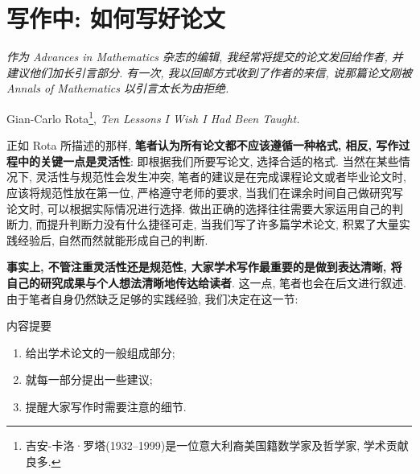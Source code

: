 \documentclass{booki}
\begin{document}
\section{写作中: 如何写好论文}
\noindent \textit{作为 Advances in Mathematics 杂志的编辑, 我经常将提交的论文发回给作者, 并建议他们加长引言部分. 有一次, 我以回邮方式收到了作者的来信, 说那篇论文刚被 Annals of Mathematics 以引言太长为由拒绝. }
\begin{flushright}
    \cndash Gian-Carlo Rota\footnote{吉安-卡洛·罗塔(1932–1999)是一位意大利裔美国籍数学家及哲学家, 学术贡献良多.}, \textit{Ten Lessons I Wish I Had Been Taught\cite{RotaTen1997}.}
\end{flushright}

正如 Rota 所描述的那样, \textbf{笔者认为所有论文都不应该遵循一种格式, 相反, 写作过程中的关键一点是灵活性}: 即根据我们所要写论文, 选择合适的格式.
当然在某些情况下, 灵活性与规范性会发生冲突, 笔者的建议是在完成课程论文或者毕业论文时, 应该将规范性放在第一位{,} 严格遵守老师的要求, 当我们在课余时间自己做研究写论文时, 可以根据实际情况进行选择.
做出正确的选择往往需要大家运用自己的判断力, 而提升判断力没有什么捷径可走, 当我们写了许多篇学术论文, 积累了大量实践经验后, 自然而然就能形成自己的判断.

\textbf{事实上, 不管注重灵活性还是规范性, 大家学术写作最重要的是做到表达清晰, 将自己的研究成果与个人想法清晰地传达给读者}. 这一点, 笔者也会在后文进行叙述.
由于笔者自身仍然缺乏足够的实践经验, 我们决定在这一节:
\begin{titledBox}{内容提要}
        \begin{enumerate}
            \item 给出学术论文的一般组成部分;
            \item 就每一部分提出一些建议;
            \item 提醒大家写作时需要注意的细节.
        \end{enumerate}
\end{titledBox}
\end{document}
